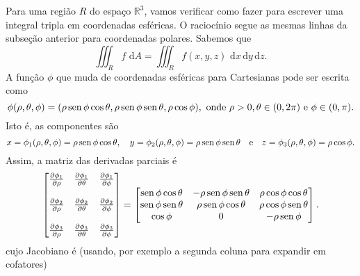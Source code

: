 \documentclass[../livro.tex]{subfiles}  %
\begin{document}
Para uma região $R$ do espaço $\mathbb{R}^3$, vamos verificar como fazer para escrever uma integral tripla em coordenadas esféricas. O raciocínio segue as mesmas linhas da subseção anterior para coordenadas polares. Sabemos que
\begin{equation}
\iiint_R f \, \, \mathrm{d} A = \iiint_R f(x,y, z) \, \, \mathrm{d} x \, \mathrm{d} y  \, \mathrm{d} z.
\end{equation} A função $\phi$ que muda de coordenadas esféricas para Cartesianas pode ser escrita como
\begin{equation}
\phi (\rho, \theta, \phi) = (\rho \operatorname{sen} \phi \cos \theta, \rho \operatorname{sen} \phi \operatorname{sen} \theta, \rho \cos \phi), \text{ onde } \rho> 0, \theta \in (0,2\pi) \text{ e } \phi \in (0, \pi).
\end{equation} Isto é, as componentes são
\begin{equation}
x = \phi_1 (\rho, \theta, \phi) = \rho \operatorname{sen} \phi \cos \theta, \quad 
y = \phi_2 (\rho, \theta, \phi) = \rho \operatorname{sen} \phi \operatorname{sen} \theta \quad \text{e} \quad 
z = \phi_3 (\rho, \theta, \phi) = \rho \cos \phi.
\end{equation} Assim, a matriz das derivadas parciais é
\begin{equation}
\begin{bmatrix}
\frac{\partial \phi_1}{\partial \rho} & \frac{\partial \phi_1}{\partial \theta} & \frac{\partial \phi_1}{\partial \phi}  \\
& & \\
\frac{\partial \phi_2}{\partial \rho} & \frac{\partial \phi_2}{\partial \theta} & \frac{\partial \phi_2}{\partial \phi} \\
& & \\
\frac{\partial \phi_3}{\partial \rho} & \frac{\partial \phi_3}{\partial \theta} & \frac{\partial \phi_3}{\partial \phi} \\
\end{bmatrix} = 
\begin{bmatrix}
\operatorname{sen} \phi \cos \theta & -\rho \operatorname{sen} \phi \operatorname{sen} \theta   & \rho \cos \phi \cos \theta \\
\operatorname{sen} \phi \operatorname{sen} \theta &  \rho \operatorname{sen} \phi \cos \theta   & \rho \cos \phi \operatorname{sen} \theta  \\
\cos \phi         &            0                  &    -\rho \operatorname{sen} \phi  \\
\end{bmatrix}.
\end{equation} cujo Jacobiano é (usando, por exemplo a segunda coluna para expandir em cofatores)
\end{document}
